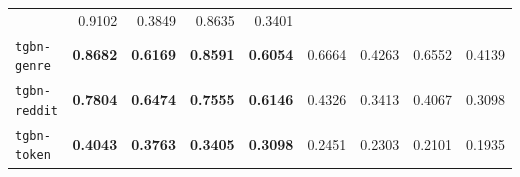 \begin{table}[!ht]
\begin{tabular}{lrrrrrrrr}
        & 0.9102 & 0.3849 & 0.8635 & 0.3401 \\                                                                                                                                                                                                               
      \texttt{tgbn-genre}                                                                                                                                                                                                                                    
        & \textbf{0.8682} & \textbf{0.6169} & \textbf{0.8591} & \textbf{0.6054}                                                                                                                                                                              
        & 0.6664 & 0.4263 & 0.6552 & 0.4139 \\                                                                                                                                                                                                               
      \texttt{tgbn-reddit}                                                                                                                                                                                                                                   
        & \textbf{0.7804} & \textbf{0.6474} & \textbf{0.7555} & \textbf{0.6146}                                                                                                                                                                              
        & 0.4326 & 0.3413 & 0.4067 & 0.3098 \\                                                                                                                                                                                                               
      \texttt{tgbn-token}                                                                                                                                                                                                                                    
        & \textbf{0.4043} & \textbf{0.3763} & \textbf{0.3405} & \textbf{0.3098}                                                                                                                                                                              
        & 0.2451 & 0.2303 & 0.2101 & 0.1935 \\                                                                                                                                                                                                               
      \bottomrule                                                                                                                                                                                                                                            
    \end{tabular}
    \endgroup
    \vspace{-5pt}
  \end{table}

